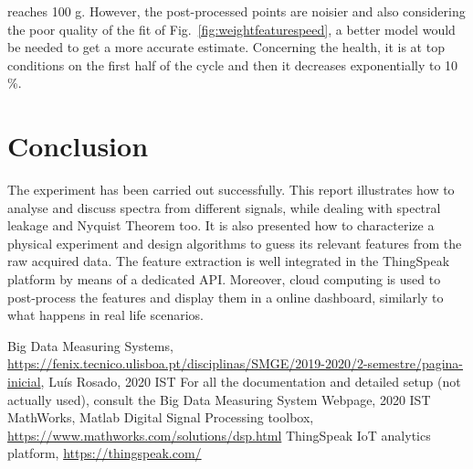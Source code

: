 \documentclass[12pt]{article}
\begin{document}
reaches 100 g. However, the post-processed points are noisier and also considering the poor quality of the fit of Fig.~\ref{fig:weightfeaturespeed}, a better model would be needed to get a more accurate estimate. Concerning the health, it is at top
conditions on the first half of the cycle and then it decreases exponentially to 10 \%.
\afterpage{\clearpage}  
\section{Conclusion}
The experiment has been carried out successfully. This report illustrates how to analyse and discuss spectra from different signals, while dealing with spectral leakage and Nyquist Theorem too. It is also presented how to characterize a physical experiment and design algorithms to guess its relevant features from the raw acquired data. The feature extraction is well
integrated in the ThingSpeak platform by means of a dedicated API. Moreover, cloud computing is used to post-process the features and display them in a online dashboard, similarly to what happens in real life scenarios.
\clearpage
\begin{thebibliography}{9}
Big Data Measuring Systems, \url{https://fenix.tecnico.ulisboa.pt/disciplinas/SMGE/2019-2020/2-semestre/pagina-inicial}, Luís Rosado, 2020 IST
For all the documentation and detailed setup (not actually used), consult the Big Data Measuring System Webpage, 2020 IST
MathWorks, Matlab Digital Signal Processing toolbox,  \url{https://www.mathworks.com/solutions/dsp.html}
ThingSpeak IoT analytics platform, \url{https://thingspeak.com/}
\end{thebibliography}
\end{document}
